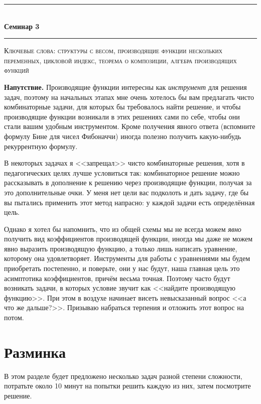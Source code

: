 \documentclass{article}
\def \topic {Семинар 3}
\theoremstyle{definition}
\begin{document}
\begin{center}

\newcommand{\HRule}{\rule{\linewidth}{0.5mm}}
\HRule \\[0.2cm]
{ \Large \bfseries \topic} %
\HRule

\end{center}

\textsc{Ключевые слова: структуры с весом, производящие функции нескольких 
переменных, цикловой индекс, теорема о композиции, алгебра производящих функций}

\textbf{Напутствие.} Производящие функции интересны как \textit{инструмент} для 
решения задач, поэтому на начальных этапах мне очень хотелось бы вам предлагать 
чисто комбинаторные задачи, для которых бы требовалось найти решение, и чтобы 
производящие функции возникали в этих решениях сами по себе, чтобы они стали 
вашим удобным инструментом. Кроме получения явного ответа (вспомните формулу 
Бине для чисел Фибоначчи) иногда полезно получить какую-нибудь рекуррентную 
формулу.

В некоторых задачах я <<запрещал>> чисто комбинаторные решения, хотя в 
педагогических целях лучше условиться так: комбинаторное решение можно 
рассказывать в дополнение к решению через производящие функции, получая за это 
дополнительные очки. У меня нет цели вас подколоть и дать задачу, где бы вы 
пытались применить этот метод напрасно: у каждой задачи есть определённая цель.

Однако я хотел бы напомнить, что из общей схемы мы 
не всегда можем \textit{явно} получить вид коэффициентов производящей функции, 
иногда мы 
даже не можем явно выразить производящую функцию, а только лишь написать 
уравнение, которому она удовлетворяет. Инструменты для работы с уравнениями мы 
будем приобретать постепенно, и поверьте, они у нас будут, наша главная цель 
это асимптотика коэффициентов, причём весьма точная. Поэтому часто будут 
возникать задачи, в которых условие звучит как <<найдите производящую 
функцию>>. При этом в воздухе начинает висеть невысказанный вопрос <<а что же 
дальше?>>. Призываю набраться терпения и отложить этот вопрос на потом.

\section{Разминка}

В этом разделе будет предложено несколько задач разной степени сложности, 
потратьте около 10 минут на попытки решить каждую из них, затем посмотрите 
решение.
\end{document}
